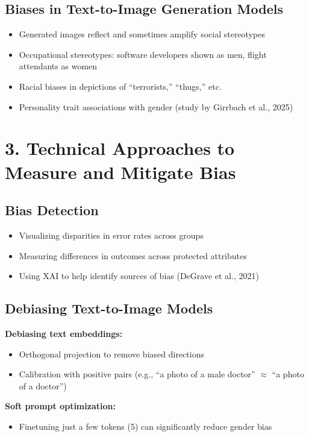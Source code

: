 \subsection*{Biases in Text-to-Image Generation Models}
\begin{itemize}
    \item Generated images reflect and sometimes amplify social stereotypes
    \item Occupational stereotypes: software developers shown as men, flight attendants as women
    \item Racial biases in depictions of ``terrorists,'' ``thugs,'' etc.
    \item Personality trait associations with gender (study by Girrbach et al., 2025)
\end{itemize}
\section*{3. Technical Approaches to Measure and Mitigate Bias}

\subsection*{Bias Detection}
\begin{itemize}
    \item Visualizing disparities in error rates across groups
    \item Measuring differences in outcomes across protected attributes
    \item Using XAI to help identify sources of bias (DeGrave et al., 2021)
\end{itemize}

\subsection*{Debiasing Text-to-Image Models}

\textbf{Debiasing text embeddings:}
\begin{itemize}
    \item Orthogonal projection to remove biased directions
    \item Calibration with positive pairs (e.g., ``a photo of a male doctor'' $\approx$ ``a photo of a doctor'')
\end{itemize}

\textbf{Soft prompt optimization:}
\begin{itemize}
    \item Finetuning just a few tokens (5) can significantly reduce gender bias
\end{itemize}

